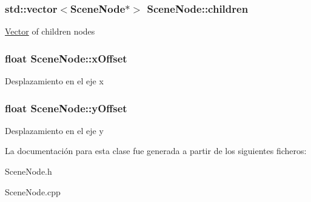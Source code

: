 \subsubsection[{children}]{\setlength{\rightskip}{0pt plus 5cm}std\+::vector$<${\bf Scene\+Node}$\ast$$>$ Scene\+Node\+::children\hspace{0.3cm}{\ttfamily [protected]}}\label{classSceneNode_a1dd91a11c15e87908157b3156da3d8cf}
\hyperlink{classVector}{Vector} of children nodes \hypertarget{classSceneNode_ad7b83da569e61908f0e828c11549610f}{}
\subsubsection[{x\+Offset}]{\setlength{\rightskip}{0pt plus 5cm}float Scene\+Node\+::x\+Offset\hspace{0.3cm}{\ttfamily [protected]}}\label{classSceneNode_ad7b83da569e61908f0e828c11549610f}
Desplazamiento en el eje x \hypertarget{classSceneNode_ac2e7bda67762d356a06386e271f41c23}{}
\subsubsection[{y\+Offset}]{\setlength{\rightskip}{0pt plus 5cm}float Scene\+Node\+::y\+Offset\hspace{0.3cm}{\ttfamily [protected]}}\label{classSceneNode_ac2e7bda67762d356a06386e271f41c23}
Desplazamiento en el eje y 

La documentación para esta clase fue generada a partir de los siguientes ficheros\+:\begin{DoxyCompactItemize}
\item 
Scene\+Node.\+h\item 
Scene\+Node.\+cpp\end{DoxyCompactItemize}

